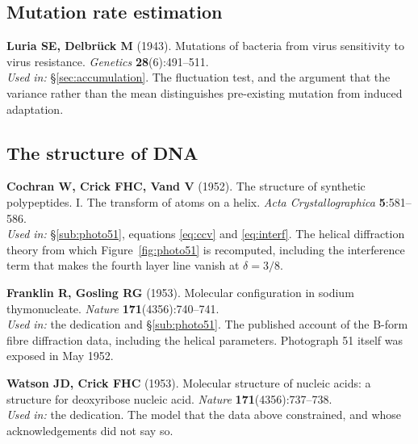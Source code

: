 \subsection*{Mutation rate estimation}

\begin{refs}
\item \textbf{Luria SE, Delbrück M} (1943). Mutations of bacteria from virus
sensitivity to virus resistance. \emph{Genetics} \textbf{28}(6):491--511.
\\[0.15em]
\emph{Used in:} §\ref{sec:accumulation}. The fluctuation test, and the argument
that the variance rather than the mean distinguishes pre-existing mutation from
induced adaptation.
\end{refs}

\subsection*{The structure of DNA}

\begin{refs}
\item \textbf{Cochran W, Crick FHC, Vand V} (1952). The structure of synthetic
polypeptides. I. The transform of atoms on a helix. \emph{Acta
Crystallographica} \textbf{5}:581--586. \nodoi
\\[0.15em]
\emph{Used in:} §\ref{sub:photo51}, equations \eqref{eq:ccv} and
\eqref{eq:interf}. The helical diffraction theory from which
Figure~\ref{fig:photo51} is recomputed, including the interference term that
makes the fourth layer line vanish at $\delta = 3/8$.

\item \textbf{Franklin R, Gosling RG} (1953). Molecular configuration in sodium
thymonucleate. \emph{Nature} \textbf{171}(4356):740--741.
\\[0.15em]
\emph{Used in:} the dedication and §\ref{sub:photo51}. The published account of
the B-form fibre diffraction data, including the helical parameters. Photograph
51 itself was exposed in May 1952.

\item \textbf{Watson JD, Crick FHC} (1953). Molecular structure of nucleic acids:
a structure for deoxyribose nucleic acid. \emph{Nature}
\textbf{171}(4356):737--738. 
\\[0.15em]
\emph{Used in:} the dedication. The model that the data above constrained, and
whose acknowledgements did not say so.
\end{refs}

